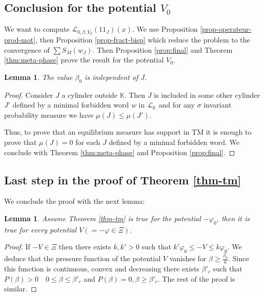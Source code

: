\documentclass[11 pt]{article}
\newtheorem{lemma}[proposition]{Lemma}
\newcommand{\BBone}{{1\!\!1}}
\theoremstyle{definition}
\begin{document}
\subsection{Conclusion for the potential $V_0$}
We want to compute $\mathcal{L}_{0,\beta,V_0}(\BBone_J)(x)$. 
We use Proposition \ref{prop-operateur-prod-mot}, then Proposition \ref{prop-fract-bisp} which reduce the problem to the convergence of $\sum S_M(w_J)$. Then
Proposition \ref{prop:final} and Theorem \ref{thm:meta-phase} prove the result for the potential $V_0$.







\begin{lemma}\label{lem-indpdt-cylindre}
The value $\beta_0$ is independent of $J$.
\end{lemma}
\begin{proof}
Consider $J$ a cylinder outside $\mathbb K$. Then $J$ is included in some other cylinder $J'$ defined by a minimal forbidden word
$w$ in $\mathcal L_{\mathbb K}$ and for any $\sigma$ invariant probability measure  we have $\mu(J)\leq \mu(J')$. 

Thus, to prove that an equilibrium measure has support in $\mathrm{TM}$ it is enough to prove that $\mu(J)=0$ for each $J$ defined by a minimal forbidden word.   
We conclude with Theorem \ref{thm:meta-phase} and Proposition \ref{prop:final}.
\end{proof}

\subsection{Last step in the proof of Theorem \ref{thm-tm}}

We conclude the proof with the next lemma:


\begin{lemma}\label{fin}
Assume Theorem \ref{thm-tm} is true for the potential $-\varphi_0$, then it is true for every potential $V(=-\varphi\in \Xi)$.
\end{lemma}
\begin{proof}
If $-V\in \Xi$ then there exists $k,k'>0$ such that $k'\varphi_0\leq-V\leq k\varphi_0$. We deduce that the pressure function of the potential $V$ vanishes for $\beta\geq \frac{\beta_0}{k}$. Since this function is continuous, convex and decreasing there exists $\beta'_c$ such that 
$P(\beta)>0 \quad 0\leq \beta\leq \beta'_c$ and $P(\beta)=0, \beta\geq \beta'_c$. 
The rest of the proof is similar. 

\end{proof}
\end{document}
